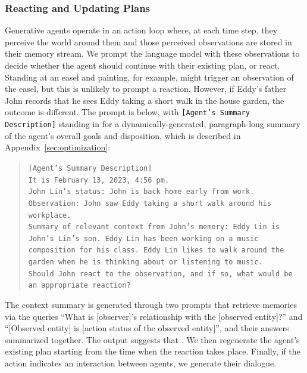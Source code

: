 \subsubsection{Reacting and Updating Plans}
Generative agents operate in an action loop where, at each time step, they perceive the world around them and those perceived observations are stored in their memory stream. We prompt the language model with these observations to decide whether the agent should continue with their existing plan, or react. Standing at an easel and painting, for example, might trigger an observation of the easel, but this is unlikely to prompt a reaction. However, if Eddy's father John records that he sees Eddy taking a short walk in the house garden, the outcome is different. The prompt is below, with \texttt{[Agent's Summary Description]} standing in for a dynamically-generated, paragraph-long summary of the agent's overall goals and disposition, which is described in Appendix~\ref{sec:optimization}:
\begin{quote}
    {\small
    \texttt{[Agent's Summary Description]\\
            It is February 13, 2023, 4:56 pm. \\
            John Lin’s status: John is back home early from work. \\
            Observation: John saw Eddy taking a short walk around his workplace.\\
            Summary of relevant context from John’s memory: Eddy Lin is John’s Lin’s son. Eddy Lin has been working on a music composition for his class. Eddy Lin likes to walk around the garden when he is thinking about or listening to music.\\
            Should John react to the observation, and if so, what would be an appropriate reaction?
    }
    }
\end{quote}
The context summary is generated through two prompts that retrieve memories via the queries ``What is [observer]’s relationship with the [observed entity]?'' and ``[Observed entity] is [action status of the observed entity]'', and their answers summarized together. The output suggests that . We then regenerate the agent's existing plan starting from the time when the reaction takes place. Finally, if the action indicates an interaction between agents, we generate their dialogue.

